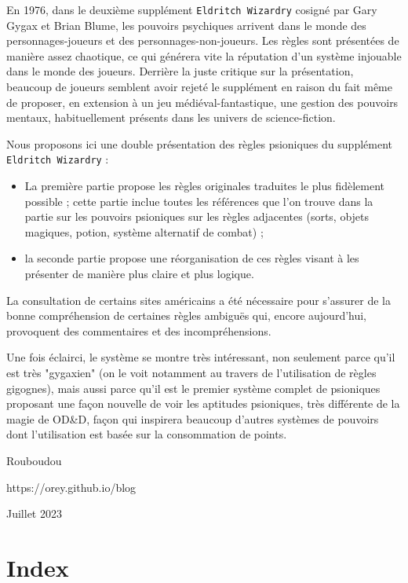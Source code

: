 \documentclass[11pt]{article}
\begin{document}
En 1976, dans le deuxième supplément \texttt{Eldritch Wizardry} cosigné par Gary Gygax et Brian Blume, les pouvoirs psychiques arrivent dans le monde des personnages-joueurs et des personnages-non-joueurs. Les règles sont présentées de manière assez chaotique, ce qui générera vite la réputation d'un système injouable dans le monde des joueurs. Derrière la juste critique sur la présentation, beaucoup de joueurs semblent avoir rejeté le supplément en raison du fait même de proposer, en extension à un jeu médiéval-fantastique, une gestion des pouvoirs mentaux, habituellement présents dans les univers de science-fiction.

Nous proposons ici une double présentation des règles psioniques du supplément \texttt{Eldritch Wizardry} :

\begin{itemize}
\item La première partie propose les règles originales traduites le plus fidèlement possible ; cette partie inclue toutes les références que l'on trouve dans la partie sur les pouvoirs psioniques sur les règles adjacentes (sorts, objets magiques, potion, système alternatif de combat) ;
\item la seconde partie propose une réorganisation de ces règles visant à les présenter de manière plus claire et plus logique.
\end{itemize}

La consultation de certains sites américains a été nécessaire pour s'assurer de la bonne compréhension de certaines règles ambiguës qui, encore aujourd'hui, provoquent des commentaires et des incompréhensions.

Une fois éclairci, le système se montre très intéressant, non seulement parce qu'il est très "gygaxien" (on le voit notamment au travers de l'utilisation de règles gigognes), mais aussi parce qu'il est le premier système complet de psioniques proposant une façon nouvelle de voir les aptitudes psioniques, très différente de la magie de OD\&D, façon qui inspirera beaucoup d'autres systèmes de pouvoirs dont l'utilisation est basée sur la consommation de points.

\vspace{1cm}

\noindent Rouboudou

\noindent https://orey.github.io/blog

\noindent Juillet 2023

\newpage

\section*{Index}
\end{document}
